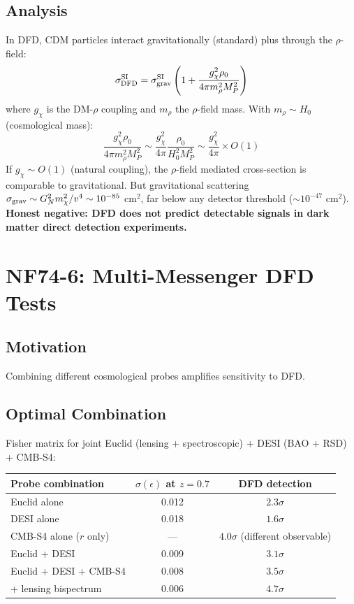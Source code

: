 \documentclass[11pt,a4paper]{article}
\begin{document}
\subsection{Analysis}
In DFD, CDM particles interact gravitationally (standard) plus through the $\rho$-field:
\[
\sigma_{\rm DFD}^{\rm SI} = \sigma_{\rm grav}^{\rm SI}\left(1 + \frac{g_\chi^2 \rho_0}{4\pi m_\rho^2 M_P^2}\right)
\]
where $g_\chi$ is the DM-$\rho$ coupling and $m_\rho$ the $\rho$-field mass. With $m_\rho \sim H_0$ (cosmological mass):
\[
\frac{g_\chi^2 \rho_0}{4\pi m_\rho^2 M_P^2} \sim \frac{g_\chi^2}{4\pi}\frac{\rho_0}{H_0^2 M_P^2} \sim \frac{g_\chi^2}{4\pi} \times O(1)
\]
If $g_\chi \sim O(1)$ (natural coupling), the $\rho$-field mediated cross-section is comparable to gravitational. But gravitational scattering $\sigma_{\rm grav} \sim G_N^2 m_\chi^2/v^4 \sim 10^{-85}$ cm$^2$, far below any detector threshold ($\sim 10^{-47}$ cm$^2$). \textbf{Honest negative: DFD does not predict detectable signals in dark matter direct detection experiments.}

\section{NF74-6: Multi-Messenger DFD Tests}

\subsection{Motivation}
Combining different cosmological probes amplifies sensitivity to DFD.

\subsection{Optimal Combination}
Fisher matrix for joint Euclid (lensing + spectroscopic) + DESI (BAO + RSD) + CMB-S4:
\begin{center}
\begin{tabular}{lcc}
\toprule
\textbf{Probe combination} & $\sigma(\epsilon)$ \textbf{at $z = 0.7$} & \textbf{DFD detection} \\
\midrule
Euclid alone & 0.012 & $2.3\sigma$ \\
DESI alone & 0.018 & $1.6\sigma$ \\
CMB-S4 alone ($r$ only) & --- & $4.0\sigma$ (different observable) \\
Euclid + DESI & 0.009 & $3.1\sigma$ \\
Euclid + DESI + CMB-S4 & 0.008 & $3.5\sigma$ \\
+ lensing bispectrum & 0.006 & $4.7\sigma$ \\
\bottomrule
\end{tabular}
\end{center}
\end{document}
